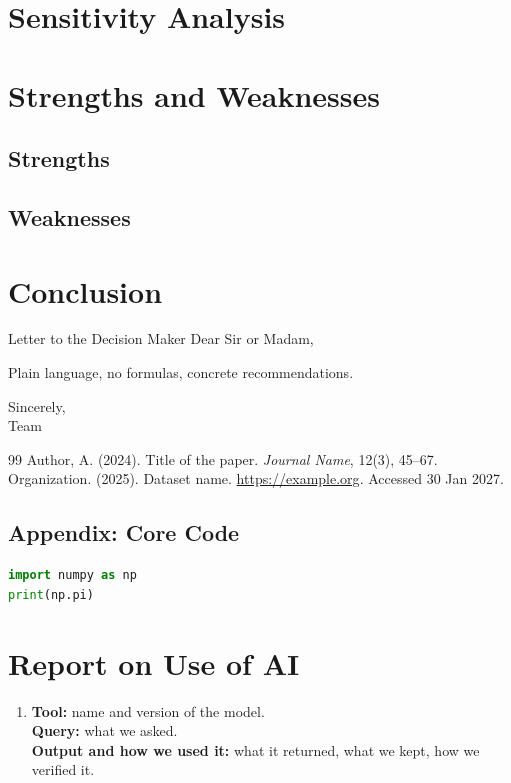 \documentclass[12pt]{article}
\begin{document}
\section{Sensitivity Analysis}

\section{Strengths and Weaknesses}
\subsection{Strengths}
\subsection{Weaknesses}

\section{Conclusion}

\begin{letter}{Letter to the Decision Maker}
\noindent Dear Sir or Madam,

Plain language, no formulas, concrete recommendations.

\vspace{1em}
\noindent Sincerely,\\
Team \control
\end{letter}

\clearpage
\begin{thebibliography}{99}
     Author, A. (2024). Title of the paper. \textit{Journal Name}, 12(3), 45--67.
     Organization. (2025). Dataset name. \url{https://example.org}. Accessed 30 Jan 2027.
\end{thebibliography}

\begin{subappendices}
\section{Appendix: Core Code}
\begin{lstlisting}[language=Python]
import numpy as np
print(np.pi)
\end{lstlisting}
\end{subappendices}

\clearpage
\section*{Report on Use of AI}
\begin{enumerate}[leftmargin=*]
    \item \textbf{Tool:} name and version of the model.\\
          \textbf{Query:} what we asked.\\
          \textbf{Output and how we used it:} what it returned, what we kept, how we verified it.
\end{enumerate}
\end{document}
